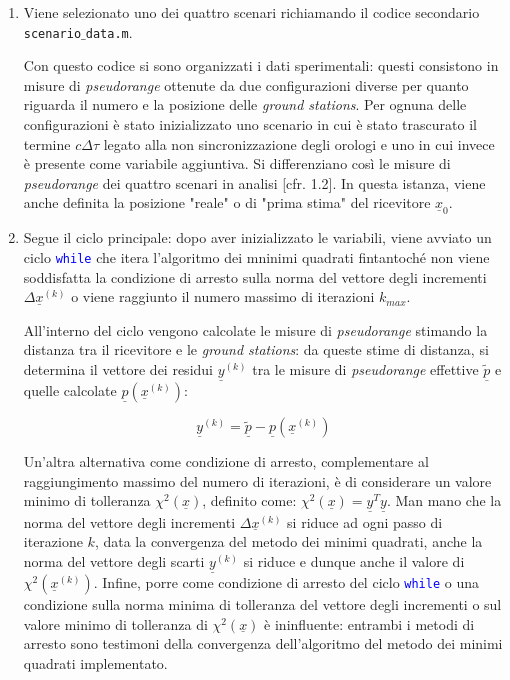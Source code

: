 \documentclass[a4paper,11pt,twoside]{book}
\begin{document}
	\begin{enumerate}
		\item  Viene selezionato uno dei quattro scenari richiamando il codice secondario \texttt{scenario$\_$data.m}.
		
		Con questo codice si sono organizzati i dati sperimentali: questi consistono in misure di \textit{pseudorange} ottenute da due configurazioni diverse per quanto riguarda il numero e la posizione delle \textit{ground stations}. Per ognuna delle configurazioni è stato inizializzato uno scenario in cui è stato trascurato il termine $c\Delta \tau$ legato alla non sincronizzazione degli orologi e uno in cui invece è presente come variabile aggiuntiva. Si differenziano così le misure di \textit{pseudorange} dei quattro scenari in analisi [cfr. 1.2]. In questa istanza, viene anche definita la posizione "reale" o di "prima stima" del ricevitore $\underline{x}_0$.
		
		
		\item Segue il ciclo principale: dopo aver inizializzato le variabili, viene avviato un ciclo \textcolor{blue}{\texttt{while}} che itera l'algoritmo dei mninimi quadrati fintantoché non viene soddisfatta la condizione di arresto sulla norma del vettore degli incrementi $\Delta \underline{x}^{(k)}$ o viene raggiunto il numero massimo di iterazioni $k_{max}$.
		
		All'interno del ciclo vengono calcolate le misure di \textit{pseudorange} stimando la distanza tra il ricevitore e le \textit{ground stations}: da queste stime di distanza, si determina il vettore dei residui $\underline{y}^{(k)}$ tra le misure di \textit{pseudorange} effettive $\underline{\tilde{p}}$ e quelle calcolate $\underline{p}(\underline{x}^{(k)})$:
		
		\begin{equation}
			\underline{y}^{(k)} = \underline{\tilde{p}} - \underline{p}(\underline{x}^{(k)})
		\end{equation}
	
		Un'altra alternativa come condizione di arresto, complementare al raggiungimento massimo del numero di iterazioni, è di considerare un valore minimo di tolleranza $\chi^2 (\underline{x})$, definito come: $\chi^2 (\underline{x}) = \underline{y}^T\underline{y}$. Man mano che la norma del vettore degli incrementi $\Delta \underline{x}^{(k)}$ si riduce ad ogni passo di iterazione $k$, data la convergenza del metodo dei minimi quadrati, anche la norma del vettore degli scarti $\underline{y}^{(k)}$ si riduce e dunque anche il valore di $\chi^2(\underline{x}^{(k)})$. Infine, porre come condizione di arresto del ciclo \textcolor{blue}{\texttt{while}} o una condizione sulla norma minima di tolleranza del vettore degli incrementi o sul valore minimo di tolleranza di $\chi^2(\underline{x})$ è ininfluente: entrambi i metodi di arresto sono testimoni della convergenza dell'algoritmo del metodo dei minimi quadrati implementato.
		

\end{enumerate}
\end{document}
